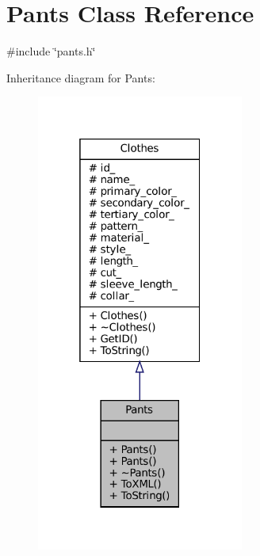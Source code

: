 \hypertarget{classPants}{}\section{Pants Class Reference}
\label{classPants}


{\ttfamily \#include \char`\"{}pants.\+h\char`\"{}}



Inheritance diagram for Pants\+:\nopagebreak
\begin{figure}[H]
\begin{center}
\leavevmode
\includegraphics[width=193pt]{classPants__inherit__graph}
\end{center}
\end{figure}


